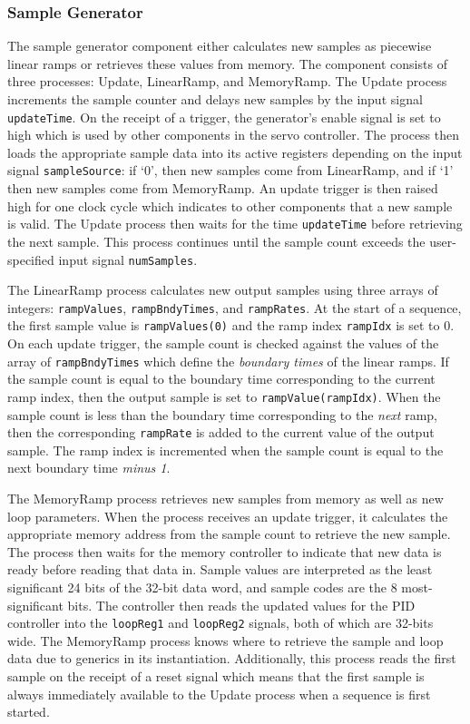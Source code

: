 \documentclass{article}
\begin{document}
\subsubsection{Sample Generator}
\label{sssec:SampleGenerator}
The sample generator component either calculates new samples as piecewise linear ramps or retrieves these values from memory.  The component consists of three processes: Update, LinearRamp, and MemoryRamp.  The Update process increments the sample counter and delays new samples by the input signal \verb+updateTime+.  On the receipt of a trigger, the generator's enable signal is set to high which is used by other components in the servo controller.  The process then loads the appropriate sample data into its active registers depending on the input signal \verb+sampleSource+: if `0', then new samples come from LinearRamp, and if `1' then new samples come from MemoryRamp.  An update trigger is then raised high for one clock cycle which indicates to other components that a new sample is valid.  The Update process then waits for the time \verb+updateTime+ before retrieving the next sample.  This process continues until the sample count exceeds the user-specified input signal \verb+numSamples+.

The LinearRamp process calculates new output samples using three arrays of integers: \verb+rampValues+, \verb+rampBndyTimes+, and \verb+rampRates+.  At the start of a sequence, the first sample value is \verb+rampValues(0)+ and the ramp index \verb+rampIdx+ is set to 0.  On each update trigger, the sample count is checked against the values of the array of \verb+rampBndyTimes+ which define the \emph{boundary times} of the linear ramps.  If the sample count is equal to the boundary time corresponding to the current ramp index, then the output sample is set to \verb+rampValue(rampIdx)+.  When the sample count is less than the boundary time corresponding to the \emph{next} ramp, then the corresponding \verb+rampRate+ is added to the current value of the output sample.  The ramp index is incremented when the sample count is equal to the next boundary time \emph{minus 1}.

The MemoryRamp process retrieves new samples from memory as well as new loop parameters.  When the process receives an update trigger, it calculates the appropriate memory address from the sample count to retrieve the new sample.  The process then waits for the memory controller to indicate that new data is ready before reading that data in.  Sample values are interpreted as the least significant 24 bits of the 32-bit data word, and sample codes are the 8 most-significant bits.  The controller then reads the updated values for the PID controller into the \verb+loopReg1+ and \verb+loopReg2+ signals, both of which are 32-bits wide.  The MemoryRamp process knows where to retrieve the sample and loop data due to generics in its instantiation.   Additionally, this process reads the first sample on the receipt of a reset signal which means that the first sample is always immediately available to the Update process when a sequence is first started.
\end{document}
